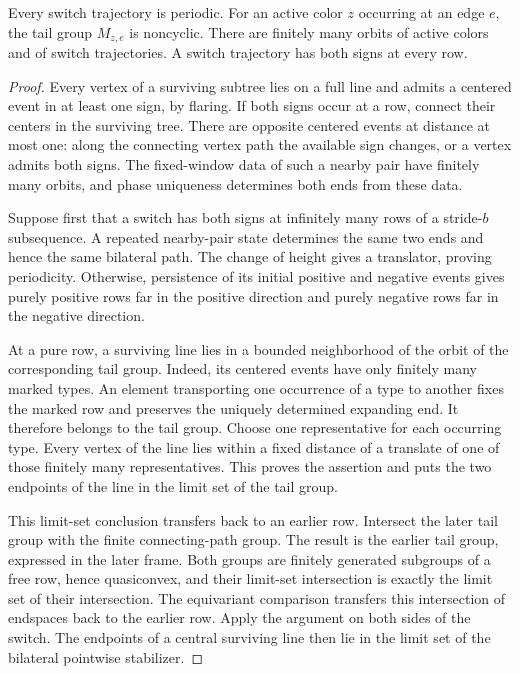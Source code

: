 \begin{lemma}\label{gate:switches}
Every switch trajectory is periodic.  For an active color $z$ occurring
at an edge $e$, the tail group $M_{z,e}$ is noncyclic.  There are finitely
many orbits of active colors and of switch trajectories.  A switch
trajectory has both signs at every row.
\end{lemma}
\begin{proof}
Every vertex of a surviving subtree lies on a full line and admits a
centered event in at least one sign, by flaring.  If both signs occur at
a row, connect their centers in the surviving tree.  There are opposite
centered events at distance at most one: along the connecting vertex path
the available sign changes, or a vertex admits both signs.  The fixed-window
data of such a nearby pair have finitely many orbits, and phase uniqueness
determines both ends from these data.

Suppose first that a switch has both signs at infinitely many rows of a
stride-$b$ subsequence.  A repeated nearby-pair state determines the same
two ends and hence the same bilateral path.  The change of height gives
a translator, proving periodicity.  Otherwise, persistence of its initial
positive and negative events gives purely positive rows far in the
positive direction and purely negative rows far in the negative direction.

At a pure row, a surviving line lies in a bounded neighborhood of the
orbit of the corresponding tail group.  Indeed, its centered events have
only finitely many marked types.  An element transporting one occurrence
of a type to another fixes the marked row and preserves the uniquely
determined expanding end.  It therefore belongs to the tail group.
Choose one representative for each occurring type.  Every vertex of the
line lies within a fixed distance of a translate of one of those finitely
many representatives.  This proves the assertion and puts the two endpoints
of the line in the limit set of the tail group.

This limit-set conclusion transfers back to an earlier row.  Intersect
the later tail group with the finite connecting-path group.  The result
is the earlier tail group, expressed in the later frame.  Both groups
are finitely generated subgroups of a free row, hence quasiconvex, and
their limit-set intersection is exactly the limit set of their intersection.
The equivariant comparison transfers this intersection of endspaces back
to the earlier row.  Apply the argument on both sides of the switch.
The endpoints of a central surviving line then lie in the limit set of
the bilateral pointwise stabilizer.


\end{proof}
